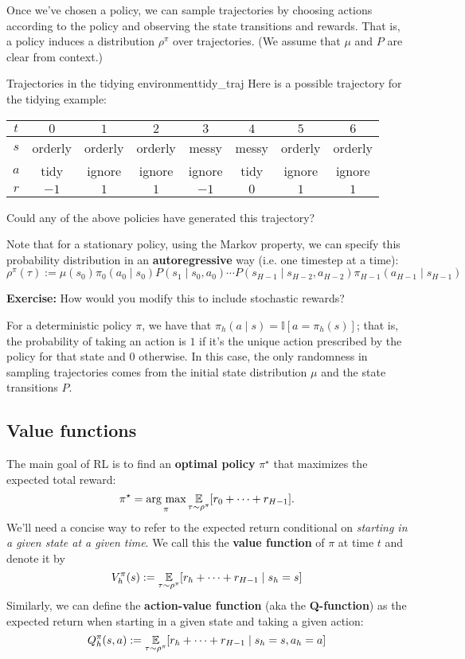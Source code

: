 \documentclass[../main/main]{subfiles}
\begin{document}
Once we've chosen a policy, we can sample trajectories by choosing actions according to the policy and observing the state transitions and rewards. That is, a policy induces a distribution $\rho^{\pi}$ over trajectories. (We assume that $\mu$ and $P$ are clear from context.)

\begin{example}{Trajectories in the tidying environment}{tidy_traj}
    Here is a possible trajectory for the tidying example:

    \begin{center}
    \begin{tabular}{cccccccc}
        $t$ & $0$ & $1$ & $2$ & $3$ & $4$ & $5$ & $6$ \\
        \hline
        $s$ & orderly & orderly & orderly & messy & messy & orderly & orderly \\
        $a$ & tidy & ignore & ignore & ignore & tidy & ignore & ignore \\
        $r$ & $-1$ & $1$ & $1$ & $-1$ & $0$ & $1$ & $1$
    \end{tabular}
    \end{center}

    Could any of the above policies have generated this trajectory?
\end{example}

Note that for a stationary policy, using the Markov property, we can specify this probability distribution in an \textbf{autoregressive} way (i.e. one timestep at a time):
\[
    \rho^{\pi}(\tau) := \mu(s_0) \pi_0(a_0 \mid s_0) P(s_1 \mid s_0, a_0) \cdots P(s_{H-1} \mid s_{H-2}, a_{H-2}) \pi_{H-1}(a_{H-1} \mid s_{H-1})
\]

\textbf{Exercise:} How would you modify this to include stochastic rewards?

For a deterministic policy $\pi$, we have that $\pi_h(a \mid s) = \mathbb{I}[a = \pi_h(s)]$; that is, the probability of taking an action is $1$ if it's the unique action prescribed by the policy for that state and $0$ otherwise. In this case, the only randomness in sampling trajectories comes from the initial state distribution $\mu$ and the state transitions $P$.

\subsection{Value functions}

The main goal of RL is to find an \textbf{optimal policy} $\pi^\star$ that maximizes the expected total reward:
\[
    \pi^{\star} = \operatorname*{\textrm{arg\ max}}_{\pi} \operatorname*{\mathbb{E}}_{\tau \sim \rho^\pi} [r_0 + \cdots + r_{H-1}].
\]
We'll need a concise way to refer to the expected return conditional on \emph{starting in a given state at a given time}. We call this the \textbf{value function} of $\pi$ at time $t$ and denote it by
\[
    V_h^\pi(s) := \operatorname*{\mathbb{E}}_{\tau \sim \rho^\pi} [r_h + \cdots + r_{H-1} \mid s_h = s]
\]
Similarly, we can define the \textbf{action-value function} (aka the \textbf{Q-function}) as the expected return when starting in a given state and taking a given action:
\[
    Q_h^\pi(s, a) := \operatorname*{\mathbb{E}}_{\tau \sim \rho^\pi} [r_h + \cdots + r_{H-1} \mid s_h = s, a_h = a]
\]
\end{document}
